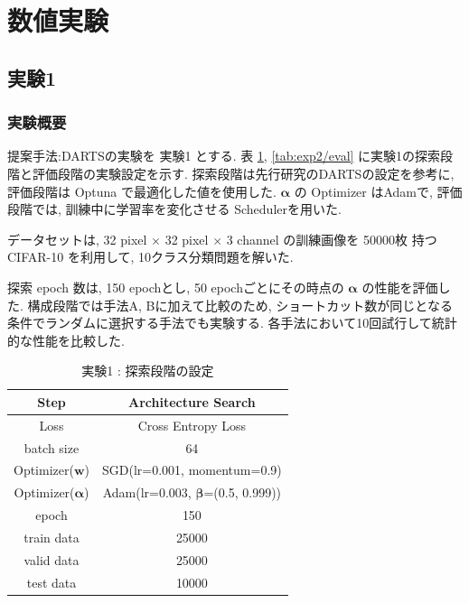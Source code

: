 \newpage
\changeindent{0cm}
\section{数値実験}
\label{sec:exp}
\changeindent{2cm}


\changeindent{0cm}
\subsection{実験1}
\label{sec:exp.01}
\changeindent{2cm}


\changeindent{0cm}
\subsubsection{実験概要}
\label{sec:exp.01_01}
\changeindent{2cm}

提案手法:DARTSの実験を 実験1 とする.
表 \ref{tab:setting_exp}, \ref{tab:exp2/eval} に実験1の探索段階と評価段階の実験設定を示す.
探索段階は先行研究のDARTSの設定を参考に, 評価段階は Optuna で最適化した値を使用した.
$\bm{\alpha}$ の Optimizer はAdam\cite{Kingma2015AdamAM}で,
評価段階では, 訓練中に学習率を変化させる Scheduler\cite{Loshchilov2017SGDRSG}を用いた.

データセットは, 32 pixel $\times$ 32 pixel $\times$ 3 channel の訓練画像を 50000枚 持つ CIFAR-10\cite{cifar10} を利用して,
10クラス分類問題を解いた.

探索 epoch 数は, 150 epochとし, 50 epochごとにその時点の $\bm{\alpha}$ の性能を評価した.
構成段階では手法A, Bに加えて比較のため,
ショートカット数が同じとなる条件でランダムに選択する手法でも実験する.
各手法において10回試行して統計的な性能を比較した.

\clearpage
\begin{table}[tb]
  \begin{center}
    \caption{実験1 : 探索段階の設定}
  	\vspace{3mm}
    \begin{tabular}{|c|c|} \hline
      Step & Architecture Search \\ \hline\hline
      Loss & Cross Entropy Loss \\ \hline
      batch size & 64 \\ \hline
      Optimizer($\bm{w}$) & SGD(lr=0.001, momentum=0.9) \\ \hline
      Optimizer($\bm{\alpha}$) & Adam(lr=0.003, $\bm{\beta}$=(0.5, 0.999)) \\ \hline
      epoch & 150\\ \hline
      train data & 25000\\ \hline
      valid data & 25000\\ \hline
      test data &  10000\\ \hline
    \end{tabular}
    \label{tab:setting_exp}
  \end{center}
\end{table}

